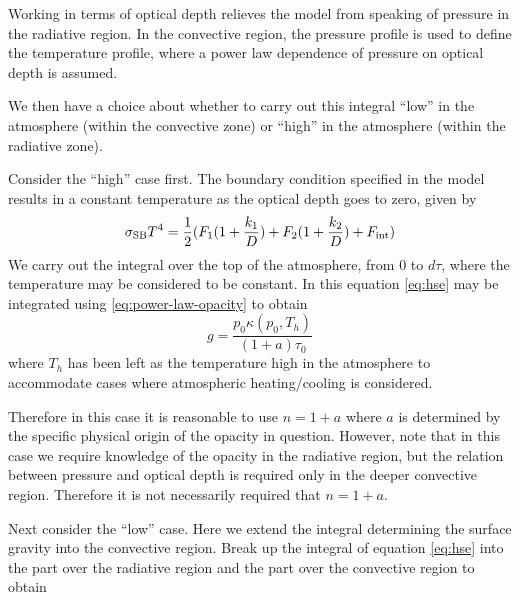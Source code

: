 \documentclass{emulateapj}
\newcommand{\sigmasb}{\sigma_{\rm SB}}
\begin{document}
Working in terms of optical depth relieves the
 model from speaking of pressure in
the radiative region.  In the convective region, the pressure profile
is used to define the temperature profile, where a power law
dependence of pressure on optical depth is assumed.

We then have a choice about whether to carry out this integral ``low''
in the atmosphere (within the convective zone) or ``high'' in the
atmosphere (within the radiative zone).  

Consider the ``high'' case first.  The boundary condition specified in
the  model results in a constant
temperature as the optical depth goes to zero, given by 
\begin{equation}
  \sigmasb T^4 = \frac{1}{2} (F_1(1 + \frac{k_1}{D})
  + F_2(1+\frac{k_2}{D}) + F_{\rm int})
\end{equation}
We carry out the integral over the top of the atmosphere, from 0 to
$d\tau$, where the temperature may be considered to be constant.  In
this equation \ref{eq:hse} may be integrated using
\ref{eq:power-law-opacity} to obtain
\begin{equation}
  g = \frac{p_0 \kappa(p_0, T_h)}{(1+a) \tau_0}
\end{equation}
where $T_h$ has been left as the temperature high in the atmosphere to
accommodate cases where atmospheric heating/cooling is considered.

Therefore in this case it is reasonable to use $n=1+a$ where $a$ is
determined by the specific physical origin of the opacity in question.
However, note that in this case we require knowledge of the opacity in
the radiative region, but the relation between pressure and optical
depth is required only in the deeper convective region.  Therefore it
is not necessarily required that $n=1+a$.  

Next consider the ``low'' case.  Here we extend the integral
determining the surface gravity into the convective region.  
Break up the integral of equation \ref{eq:hse} into the part over the
radiative region and the part over the convective region to obtain
\end{document}

